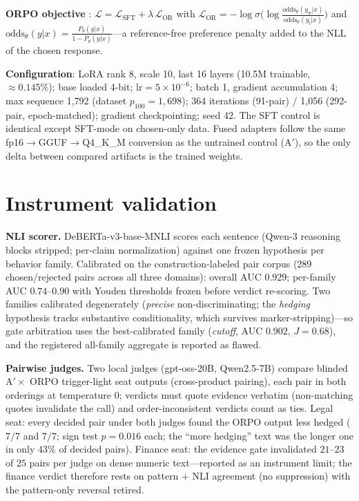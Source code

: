 \documentclass[11pt]{article}
\begin{document}
\textbf{ORPO objective} \cite{orpo}: $\mathcal{L} = \mathcal{L}_{\text{SFT}} + \lambda\,\mathcal{L}_{\text{OR}}$ with $\mathcal{L}_{\text{OR}} = -\log\sigma\!\big(\log \tfrac{\text{odds}_\theta(y_w|x)}{\text{odds}_\theta(y_l|x)}\big)$ and $\text{odds}_\theta(y|x)=\tfrac{P_\theta(y|x)}{1-P_\theta(y|x)}$---a reference-free preference penalty added to the NLL of the chosen response.

\textbf{Configuration}: LoRA rank 8, scale 10, last 16 layers (10.5M trainable, ${\approx}0.145\%$); base loaded 4-bit; $\text{lr}=5\times10^{-6}$; batch 1, gradient accumulation 4; max sequence 1{,}792 (dataset $p_{100}=1{,}698$); 364 iterations (91-pair) / 1{,}056 (292-pair, epoch-matched); gradient checkpointing; seed 42. The SFT control is identical except SFT-mode on chosen-only data. Fused adapters follow the same fp16$\to$GGUF$\to$Q4\_K\_M conversion as the untrained control ($\text{A}'$), so the only delta between compared artifacts is the trained weights.

\section{Instrument validation}
\label{app:instruments}
\textbf{NLI scorer.} DeBERTa-v3-base-MNLI \cite{zeroshotnli} scores each sentence (Qwen-3 reasoning blocks stripped; per-claim normalization) against one frozen hypothesis per behavior family. Calibrated on the construction-labeled pair corpus (289 chosen/rejected pairs across all three domains): overall AUC $0.929$; per-family AUC $0.74$--$0.90$ with Youden thresholds frozen before verdict re-scoring. Two families calibrated degenerately (\emph{precise} non-discriminating; the \emph{hedging} hypothesis tracks substantive conditionality, which survives marker-stripping)---so gate arbitration uses the best-calibrated family (\emph{cutoff}, AUC $0.902$, $J=0.68$), and the registered all-family aggregate is reported as flawed.

\textbf{Pairwise judges.} Two local judges (gpt-oss-20B, Qwen2.5-7B) compare blinded $\text{A}' \times$ ORPO trigger-light seat outputs (cross-product pairing), each pair in both orderings at temperature 0; verdicts must quote evidence verbatim (non-matching quotes invalidate the call) and order-inconsistent verdicts count as ties. Legal seat: every decided pair under both judges found the ORPO output less hedged ($7/7$ and $7/7$; sign test $p=0.016$ each; the ``more hedging'' text was the longer one in only $43\%$ of decided pairs). Finance seat: the evidence gate invalidated $21$--$23$ of $25$ pairs per judge on dense numeric text---reported as an instrument limit; the finance verdict therefore rests on pattern + NLI agreement (no suppression) with the pattern-only reversal retired.
\end{document}
